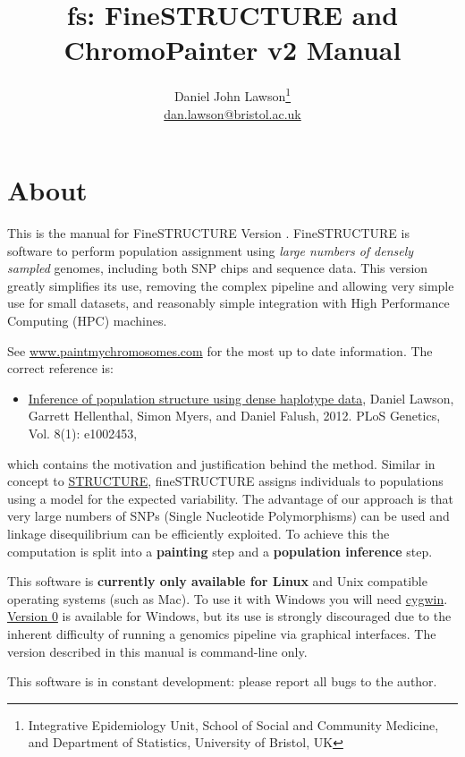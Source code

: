 \documentclass[11pt]{article}
\title{fs: FineSTRUCTURE and ChromoPainter v2 Manual}
\author{Daniel John Lawson\thanks{Integrative Epidemiology Unit, School of Social and Community Medicine, and Department of Statistics, University of Bristol, UK}\\\href{mailto:dan.lawson@bristol.ac.uk}{dan.lawson@bristol.ac.uk} }
\begin{document}
\maketitle

\section*{About}
This is the manual for FineSTRUCTURE Version . %
FineSTRUCTURE is software to perform population assignment using \emph{large numbers of densely sampled} genomes, including both SNP chips and sequence data. This version greatly simplifies its use, removing the complex pipeline and allowing very simple use for small datasets, and reasonably simple integration with High Performance Computing (HPC) machines.

See \url{www.paintmychromosomes.com} for the most up to date information.  The correct reference is: 
\begin{itemize}
\item \href{http://www.plosgenetics.org/article/info%3Adoi%2F10.1371%2Fjournal.pgen.1002453}{Inference of population structure using dense haplotype data}, Daniel Lawson, Garrett Hellenthal, Simon Myers, and Daniel Falush, 2012. PLoS Genetics, Vol. 8(1): e1002453,
\end{itemize}
which contains the motivation and justification
behind the method.  Similar in concept to \href{http://pritch.bsd.uchicago.edu/software.html}{STRUCTURE},
fineSTRUCTURE assigns individuals to populations using a model for the expected variability.
The advantage of our approach is that very large numbers of SNPs (Single Nucleotide
Polymorphisms) can be used and linkage disequilibrium can be efficiently exploited. To achieve this the computation is split into a {\bf painting} step and a {\bf population inference} step.

This software is {\bf currently only available for Linux} and Unix compatible operating systems (such as Mac). To use it with Windows you will need \href{http://www.cygwin.com}{cygwin}. \href{http://www.maths.bris.ac.uk/~madjl/finestructure-old}{Version 0} is available for Windows, but its use is strongly discouraged due to the inherent difficulty of running a genomics pipeline via graphical interfaces. The version described in this manual is command-line only.

This software is in constant development: please report all bugs to the author.
\end{document}

